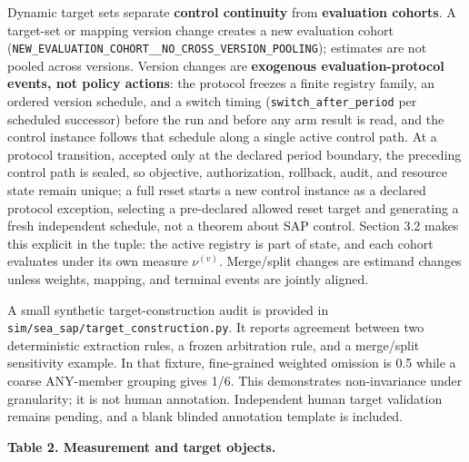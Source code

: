 \documentclass[
  11pt]{article}
\begin{document}
Dynamic target sets separate \textbf{control continuity} from
\textbf{evaluation cohorts}. A target-set or mapping version change
creates a new evaluation cohort
(\texttt{NEW\_EVALUATION\_COHORT\_\_NO\_CROSS\_VERSION\_POOLING});
estimates are not pooled across versions. Version changes are
\textbf{exogenous evaluation-protocol events, not policy actions}: the
protocol freezes a finite registry family, an ordered version schedule,
and a switch timing (\texttt{switch\_after\_period} per scheduled
successor) before the run and before any arm result is read, and the
control instance follows that schedule along a single active control
path. At a protocol transition, accepted only at the declared period
boundary, the preceding control path is sealed, so objective,
authorization, rollback, audit, and resource state remain unique; a full
reset starts a new control instance as a declared protocol exception,
selecting a pre-declared allowed reset target and generating a fresh
independent schedule, not a theorem about SAP control. Section 3.2 makes
this explicit in the tuple: the active registry is part of state, and
each cohort evaluates under its own measure \(\nu^{(v)}\). Merge/split
changes are estimand changes unless weights, mapping, and terminal
events are jointly aligned.

A small synthetic target-construction audit is provided in
\texttt{sim/sea\_sap/target\_construction.py}. It reports agreement
between two deterministic extraction rules, a frozen arbitration rule,
and a merge/split sensitivity example. In that fixture, fine-grained
weighted omission is 0.5 while a coarse ANY-member grouping gives 1/6.
This demonstrates non-invariance under granularity; it is not human
annotation. Independent human target validation remains pending, and a
blank blinded annotation template is included.

\textbf{Table 2. Measurement and target objects.}
\end{document}
